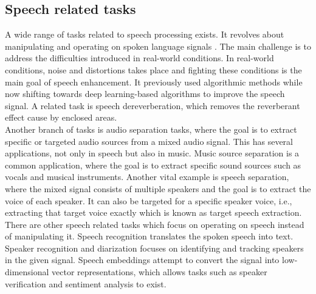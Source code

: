 \subsection{Speech related tasks}
A wide range of tasks related to speech processing exists. It revolves about manipulating and operating on spoken language signals \cite{mehrish2023}. The main challenge is to address the difficulties introduced in real-world conditions. In real-world conditions, noise and distortions takes place and fighting these conditions is the main goal of speech enhancement. It previously used algorithmic methods while now shifting towards deep learning-based algorithms to improve the speech signal. A related task is speech dereverberation, which removes the reverberant effect cause by enclosed areas.\\
Another branch of tasks is audio separation tasks, where the goal is to extract specific or targeted audio sources from a mixed audio signal. This has several applications, not only in speech but also in music. Music source separation is a common application, where the goal is to extract specific sound sources such as vocals and musical instruments. Another vital example is speech separation, where the mixed signal consists of multiple speakers and the goal is to extract the voice of each speaker. It can also be targeted for a specific speaker voice, i.e., extracting that target voice exactly which is known as target speech extraction.\\
There are other speech related tasks which focus on operating on speech instead of manipulating it. Speech recognition translates the spoken speech into text. Speaker recognition and diarization focuses on identifying and tracking speakers in the given signal. Speech embeddings attempt to convert the signal into low-dimensional vector representations, which allows tasks such as speaker verification and sentiment analysis to exist.

